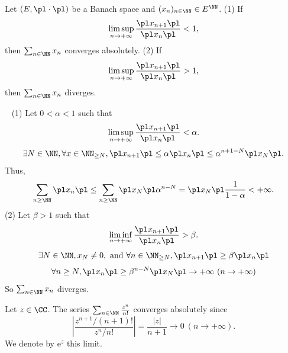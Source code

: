 \begin{theoremenv}
    Let $(E,\pl \cdot\pl )$ be a Banach space and $(x_n)_{n\in \NN}\in E^\NN$.
    \newline
    (1) If 
    $$ \limsup_{n\rightarrow+\infty}\frac{\pl x_{n+1}\pl}{\pl x_n\pl}<1,$$
    then $\sum_{n\in\NN}x_n$ converges absolutely.
    \newline
    (2) If 
    $$ \limsup_{n\rightarrow+\infty}\frac{\pl x_{n+1}\pl}{\pl x_n\pl}>1,$$
    then $\sum_{n\in\NN}x_n$ diverges.
\end{theoremenv}
\begin{proofenv}
\ \newline
(1) Let $0<\alpha<1$ such that 
$$ \limsup_{n\rightarrow +\infty}\frac{\pl x_{n+1}\pl}{\pl x_n\pl}<\alpha.$$
$$ \exists N\in \NN, \forall x\in \NN_{\ge N}, \pl x_{n+1}\pl \le  \alpha \pl x_n\pl\le \alpha^{n+1-N}\pl x_N\pl.$$
Thus,
$$ \sum_{n\ge \NN}\pl x_n\pl \le \sum_{n\ge \NN}\pl x_N\pl \alpha^{n-N}=\pl x_N\pl \frac{1}{1-\alpha}<+\infty.$$
(2) Let $\beta>1$ such that 
$$ \liminf_{n\rightarrow +\infty}\frac{\pl x_{n+1}\pl }{\pl x_n\pl}>\beta.$$
$$ \exists N\in \NN, x_N\neq 0, \text{ and } \forall n\in \NN_{\ge N},\pl x_{n+1}\pl\ge \beta\pl x_n\pl$$
$$ \forall n\ge N,\pl x_n\pl\ge \beta ^{n-N} \pl x_N\pl \rightarrow +\infty\  (n\rightarrow+\infty)$$
So $\sum_{n\in \NN}x_n$ diverges.
\end{proofenv}
\begin{box2}
    Let $z\in \CC$. The series $\sum_{n\in \NN}\frac{z^n}{n!}$ converges absolutely since
    $$\left|\frac{z^{n+1}/(n+1)!}{z^n/n!}\right|=\frac{ |z| }{n+1}\rightarrow 0\  (n\rightarrow +\infty).$$
    We denote by $\mathrm{e}^z$ this limit.
\end{box2}


